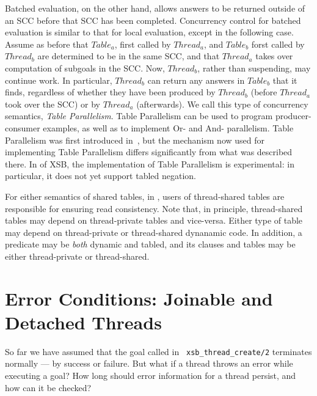 Batched evaluation, on the other hand, allows answers to be returned
outside of an SCC before that SCC has been completed.  Concurrency
control for batched evaluation is similar to that for local
evaluation, except in the following case.  Assume as before that
$Table_a$, first called by $Thread_a$, and $Table_b$ forst called by
$Thread_b$ are determined to be in the same SCC, and that $Thread_a$
takes over computation of subgoals in the SCC.  Now, $Thread_b$,
rather than suspending, may continue work.  In particular, $Thread_b$
can return any answers in $Table_b$ that it finds, regardless of
whether they have been produced by $Thread_b$ (before $Thread_a$ took
over the SCC) or by $Thread_a$ (afterwards).  We call this type of
concurrency semantics, {\em Table Parallelism}.  Table Parallelism can
be used to program producer-consumer examples, as well as to implement
Or- and And- parallelism.  Table Parallelism was first introduced
in~\cite{FHSW95}, but the mechanism now used for implementing Table
Parallelism differs significantly from what was described there.  In
\version{} of XSB, the implementation of Table Parallelism is
experimental: in particular, it does not yet support tabled negation.

For either semantics of shared tables, in \version{}, users of
thread-shared tables are responsible for ensuring read consistency.
Note that, in principle, thread-shared tables may depend on
thread-private tables and vice-versa.  Either type of table may depend
on thread-private or thread-shared dynanamic code.  In addition, a
predicate may be {\em both} dynamic and tabled, and its clauses and
tables may be either thread-private or thread-shared.

\section{Error Conditions: Joinable and Detached Threads}

So far we have assumed that the goal called in {\tt
  xsb\_thread\_create/2} terminates normally --- by success or
failure.  But what if a thread throws an error while executing a goal?
How long should error information for a thread persist, and how can it
be checked?

